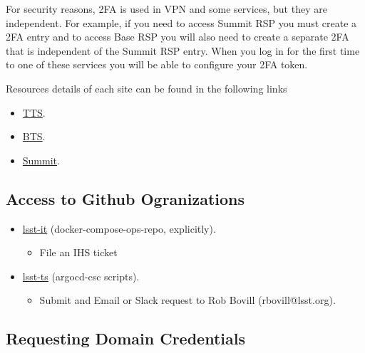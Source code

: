 For security reasons, 2FA is used in VPN and some services, but they are independent. For example, if you need to access Summit RSP you must create a 2FA entry and to access Base RSP you will also need to create a separate 2FA that is independent of the Summit RSP entry. When you log in for the first time to one of these services you will be able to configure your 2FA token.

Resources details of each site can be found in the following links

\begin{itemize}
	\item[a)] \href{https://obs-controls.lsst.io/System-Testing-Deployments-and-Upgrades/Control-System-Upgrade/Deployment-Activities/tucson-teststand/index.html}{TTS}.
	
	\item[b)] \href{https://obs-controls.lsst.io/System-Testing-Deployments-and-Upgrades/Control-System-Upgrade/Deployment-Activities/base-teststand/index.html#deployment-activities-bts-resources}{BTS}.
	
	\item[c)] \href{https://obs-controls.lsst.io/System-Testing-Deployments-and-Upgrades/Control-System-Upgrade/Deployment-Activities/summit/index.html}{Summit}.
	
\end{itemize}

\subsection{Access to Github Ogranizations}

\begin{itemize}
	\item[a)] \href{https://github.com/lsst-it}{lsst-it} (docker-compose-ops-repo, explicitly).
	\begin{itemize}
		\item File an IHS ticket
	\end{itemize}
	\item[b)] \href{https://github.com/lsst-ts}{lsst-ts} (argocd-csc scripts).
	\begin{itemize}
		\item Submit and Email or Slack request to Rob Bovill (rbovill@lsst.org).
	\end{itemize}
\end{itemize}

\subsection{Requesting Domain Credentials}
\label{sec:Domain}

